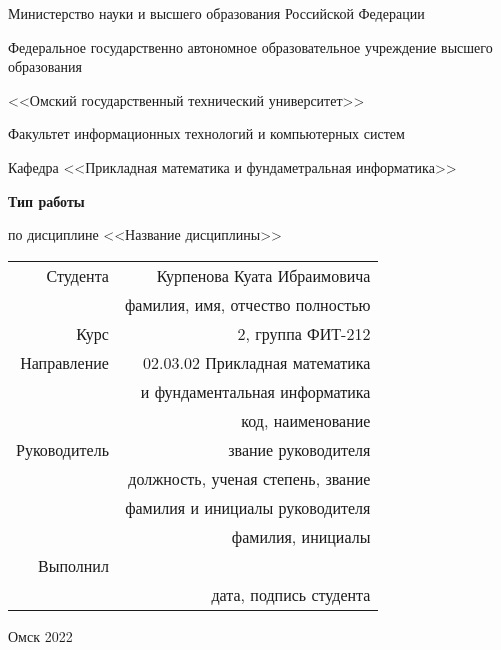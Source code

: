\documentclass[14pt, a4paper]{article}
\begin{document}
    \thispagestyle{empty}

    \begin{center}
        Министерство науки и высшего образования Российской Федерации

        Федеральное государственно автономное образовательное учреждение высшего образования

        <<Омский государственный технический университет>>

        \vspace{1cm}
        Факультет информационных технологий и компьютерных систем

        Кафедра <<Прикладная математика и фундаметральная информатика>>

        \vspace{3cm}
        \textbf{Тип работы}

        по дисциплине <<Название дисциплины>>
    \end{center}
    
    \vspace{3cm}
    \begin{flushright}    
        \begin{tabular}{ r r }
            Студента & Курпенова Куата Ибраимовича \\
            \cline{2-2}
            & \tiny{фамилия, имя, отчество полностью} \\

            Курс & 2, группа ФИТ-212 \\
            \cline{2-2}
            Направление & 02.03.02 Прикладная математика \\
            \cline{2-2}
            & и фундаментальная информатика \\
            \cline{2-2}
            & \tiny{код, наименование} \\
            
            Руководитель & звание руководителя \\
            \cline{2-2}
            & \tiny{должность, ученая степень, звание} \\
            & фамилия и инициалы руководителя \\
            \cline{2-2}
            & \tiny{фамилия, инициалы} \\
            
            Выполнил & \\
            \cline{2-2}
            & \tiny{дата, подпись студента} \\
            
        \end{tabular}
    \end{flushright}
    
    \vspace*{\fill}
    \begin{center}
        Омск 2022
    \end{center}

    \newpage
\end{document}

